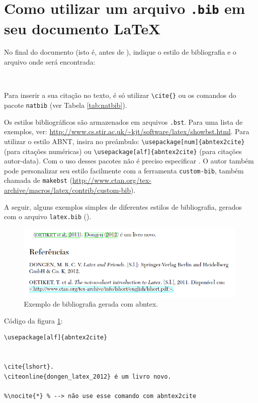 \section{Como utilizar um arquivo \texttt{.bib} em seu documento \LaTeX}

No final do documento (isto é, antes de \verb++), indique o estilo de bibliografia e o arquivo onde será encontrada:

\begin{verbatim}


\end{verbatim}

Para inserir a sua citação no texto, é só utilizar \verb+\cite{}+ ou os comandos do pacote \texttt{natbib} (ver Tabela \ref{tab:natbib}).

Os estilos bibliográficos são armazenados em arquivos \texttt{.bst}. Para uma lista de exemplos, ver: \url{http://www.cs.stir.ac.uk/~kjt/software/latex/showbst.html}. Para utilizar o estilo ABNT, insira no preâmbulo: 
\verb+\usepackage[num]{abntex2cite}+ (para citações numéricas) ou \verb+\usepackage[alf]{abntex2cite}+ (para citações autor-data). Com o uso desses pacotes não é preciso especificar \verb++.
O autor também pode personalizar seu estilo facilmente com a ferramenta \texttt{custom-bib}, também chamada de \texttt{makebst} (\url{http://www.ctan.org/tex-archive/macros/latex/contrib/custom-bib}).


A seguir, alguns exemplos simples de diferentes estilos de bibliografia, gerados com o arquivo \texttt{latex.bib} (\pageref*{latex-bib}).



\begin{figure}
\centering
\includegraphics[width=0.7\linewidth]{./abntex-bibliografia-figura}
\caption{Exemplo de bibliografia gerada com abntex.}
\label{fig:abntex-bibliografia-figura}
\end{figure}

Código da figura \ref{fig:abntex-bibliografia-figura}:

\begin{verbatim}
\usepackage[alf]{abntex2cite}


\cite{lshort}.
\citeonline{dongen_latex_2012} é um livro novo.

%\nocite{*} % --> não use esse comando com abntex2cite



\end{verbatim}


